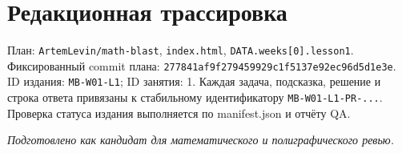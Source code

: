 \documentclass[11pt,a4paper,openany]{book}
\begin{document}
\section{Редакционная трассировка}
План: \texttt{ArtemLevin/math-blast}, \texttt{index.html}, \texttt{DATA.weeks[0].lesson1}. Фиксированный commit плана: \texttt{277841af9f279459929c1f5137e92ec96d5d1e3e}. ID издания: \texttt{MB-W01-L1}; ID занятия: 1. Каждая задача, подсказка, решение и строка ответа привязаны к стабильному идентификатору \texttt{MB-W01-L1-PR-...}. Проверка статуса издания выполняется по manifest.json и отчёту QA.\par
\textit{Подготовлено как кандидат для математического и полиграфического ревью.}\par
\end{document}
